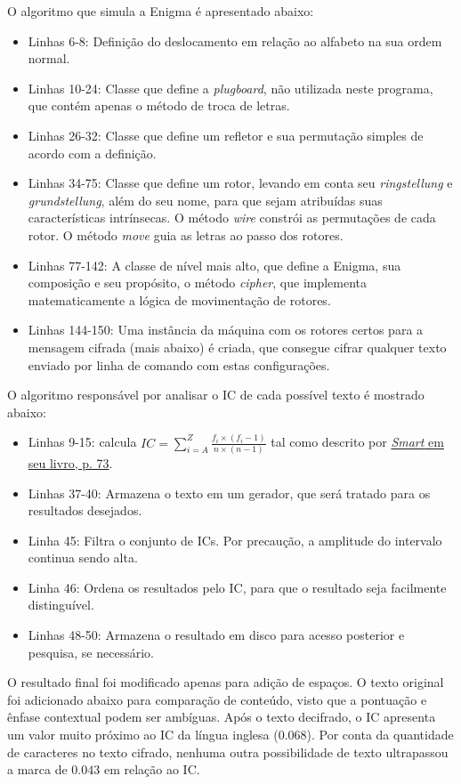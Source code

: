 \documentclass{article}
\begin{document}
O algoritmo que simula a Enigma é apresentado abaixo:

\begin{itemize}
    \item Linhas 6-8: Definição do deslocamento em relação ao alfabeto na sua ordem normal.
    \item Linhas 10-24: Classe que define a \textit{plugboard}, não utilizada neste programa, que contém apenas o método de troca de letras.
    \item Linhas 26-32: Classe que define um refletor e sua permutação simples de acordo com a definição.
    \item Linhas 34-75: Classe que define um rotor, levando em conta seu \textit{ringstellung} e \textit{grundstellung}, além do seu nome, para que sejam atribuídas suas características intrínsecas. O método \textit{wire} constrói as permutações de cada rotor. O método \textit{move} guia as letras ao passo dos rotores.
    \item Linhas 77-142: A classe de nível mais alto, que define a Enigma, sua composição e seu propósito, o método \textit{cipher}, que implementa matematicamente a lógica de movimentação de rotores.
    \item Linhas 144-150: Uma instância da máquina com os rotores certos para a mensagem cifrada (mais abaixo) é criada, que consegue cifrar qualquer texto enviado por linha de comando com estas configurações.
\end{itemize}
O algoritmo responsável por analisar o IC de cada possível texto é mostrado abaixo:

\begin{itemize}
    \item Linhas 9-15: calcula $IC = \sum_{i=A}^Z \frac{f_i \times (f_i - 1)}{n \times (n - 1)}$ tal como descrito por \href{http://www.cs.umd.edu/~waa/414-F11/IntroToCrypto.pdf}{\textit{Smart} em seu livro, p. 73}.
    \item Linhas 37-40: Armazena o texto em um gerador, que será tratado para os resultados desejados.
    \item Linha 45: Filtra o conjunto de ICs. Por precaução, a amplitude do intervalo continua sendo alta.
    \item Linha 46: Ordena os resultados pelo IC, para que o resultado seja facilmente distinguível.
    \item Linhas 48-50: Armazena o resultado em disco para acesso posterior e pesquisa, se necessário.
\end{itemize}
O resultado final foi modificado apenas para adição de espaços. O texto original foi adicionado abaixo para comparação de conteúdo, visto que a pontuação e ênfase contextual podem ser ambíguas. Após o texto decifrado, o IC apresenta um valor muito próximo ao IC da língua inglesa ($0.068$). Por conta da quantidade de caracteres no texto cifrado, nenhuma outra possibilidade de texto ultrapassou a marca de $0.043$ em relação ao IC. \\
\end{document}
